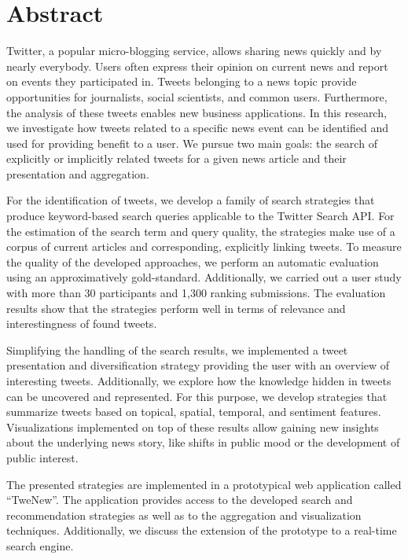 \makeatletter\@openrightfalse
\chapter*{Abstract}
Twitter, a popular micro-blogging service, allows sharing news quickly and by nearly everybody. Users often express their opinion on current news and report on events they participated in. Tweets belonging to a news topic provide opportunities for journalists, social scientists, and common users. Furthermore, the analysis of these tweets enables new business applications. In this research, we investigate how tweets related to a specific news event can be identified and used for providing benefit to a user. We pursue two main goals: the search of explicitly or implicitly related tweets for a given news article and their presentation and aggregation. 

For the identification of tweets, we develop a family of search strategies that produce keyword-based search queries applicable to the Twitter Search API. For the estimation of the search term and query quality, the strategies make use of a corpus of current articles and corresponding, explicitly linking tweets. To measure  the quality of the developed approaches, we perform an automatic evaluation using an approximatively gold-standard. Additionally, we carried out a user study with more than 30 participants and 1,300 ranking submissions. The evaluation results show that the strategies perform well in terms of relevance and interestingness of found tweets.

Simplifying the handling of the search results, we implemented a tweet presentation and diversification strategy providing the user with an overview of interesting tweets. Additionally, we explore how the knowledge hidden in tweets can be uncovered and represented. For this purpose, we develop strategies that summarize tweets based on topical, spatial, temporal, and sentiment features. Visualizations implemented on top of these results allow gaining new insights about the underlying news story, like shifts in public mood or the development of public interest.

The presented strategies are implemented in a prototypical web application called ``TweNew''. The application provides access to the developed search and recommendation strategies as well as to the aggregation and visualization techniques. Additionally, we discuss the extension of the prototype to a real-time search engine. %

